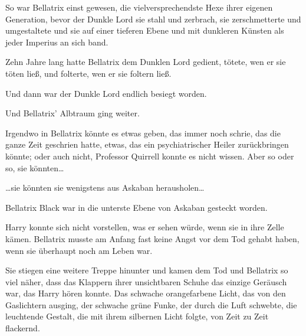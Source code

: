 So war Bellatrix einst gewesen, die vielversprechendste Hexe ihrer eigenen Generation, bevor der Dunkle Lord sie stahl und zerbrach, sie zerschmetterte und umgestaltete und sie auf einer tieferen Ebene und mit dunkleren Künsten als jeder Imperius an sich band.

Zehn Jahre lang hatte Bellatrix dem Dunklen Lord gedient, tötete, wen er sie töten ließ, und folterte, wen er sie foltern ließ.

Und dann war der Dunkle Lord endlich besiegt worden.

Und Bellatrix’ Albtraum ging weiter.

Irgendwo in Bellatrix könnte es etwas geben, das immer noch schrie, das die ganze Zeit geschrien hatte, etwas, das ein psychiatrischer Heiler zurückbringen könnte; oder auch nicht, Professor Quirrell konnte es nicht wissen. Aber so oder so, sie könnten…

…sie könnten sie wenigstens aus Askaban herausholen…

Bellatrix Black war in die unterste Ebene von Askaban gesteckt worden.

Harry konnte sich nicht vorstellen, was er sehen würde, wenn sie in ihre Zelle kämen. Bellatrix musste am Anfang fast keine Angst vor dem Tod gehabt haben, wenn sie überhaupt noch am Leben war.

Sie stiegen eine weitere Treppe hinunter und kamen dem Tod und Bellatrix so viel näher, dass das Klappern ihrer unsichtbaren Schuhe das einzige Geräusch war, das Harry hören konnte. Das schwache orangefarbene Licht, das von den Gaslichtern ausging, der schwache grüne Funke, der durch die Luft schwebte, die leuchtende Gestalt, die mit ihrem silbernen Licht folgte, von Zeit zu Zeit flackernd.

